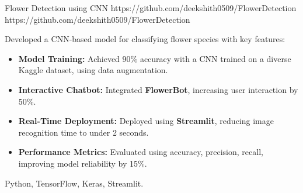 \documentclass[a4paper,10pt]{article}
\begin{document}
\projectentry
{Flower Detection using CNN}
{https://github.com/deekshith0509/FlowerDetection}
{https://github.com/deekshith0509/FlowerDetection}
{Developed a CNN-based model for classifying flower species with key features:
\begin{itemize}
\item \textbf{Model Training:} Achieved 90\% accuracy with a CNN trained on a diverse Kaggle dataset, using data augmentation.
    \item \textbf{Interactive Chatbot:} Integrated \textbf{FlowerBot}, increasing user interaction by 50\%.
    \item \textbf{Real-Time Deployment:} Deployed using \textbf{Streamlit}, reducing image recognition time to under 2 seconds.
    \item \textbf{Performance Metrics:} Evaluated using accuracy, precision, recall, improving model reliability by 15\%.
\end{itemize}
}
{Python, TensorFlow, Keras, Streamlit.}

\vspace{10pt}

\iffalse
\projectentry
{Binaries Development Repository}
{https://github.com/deekshith0509/Binary_Development}
{https://github.com/deekshith0509/Binary_Development}
{This repository showcases my ability to create standalone binaries from various types of scripts:
\begin{itemize}
\item \textbf{Binary Creation:} Converts shell scripts and Python code into binaries for easy distribution and use.
\item \textbf{Source Code Security:} Binaries make original source code inaccessible, enhancing security and privacy measures.
\item \textbf{Automation Scripts:} Features tools for web scraping, audio editing, and other daily automation tasks efficiently.
\item \textbf{Diverse Tools:} Continuously updated with a wide range of applications to enhance productivity and workflow.
\item \textbf{Cross-Platform Support:} Provides instructions for using Termux on Android to seamlessly run Linux tools.
\end{itemize}
}{Bash, Python, SHC, PyInstaller, Nuitka, Termux.}

\vspace{8pt}
\fi
\end{document}
